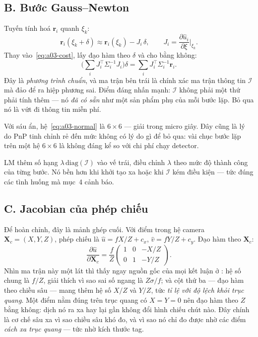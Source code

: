 \documentclass[../../marker.tex]{subfiles}
\begin{document}
\subsection{B. Bước Gauss--Newton}

Tuyến tính hoá \(\mathbf{r}_i\) quanh \(\xi_k\):
\[
\mathbf{r}_i(\xi_k + \delta) \approx \mathbf{r}_i(\xi_k) - J_i\,\delta,
\qquad J_i = \frac{\partial \hat{u}_i}{\partial \xi}\bigg|_{\xi_k}.
\]
Thay vào~\eqref{eq:a03-cost}, lấy đạo hàm theo \(\delta\) và cho bằng không:
\begin{equation}
\Big(\sum_i J_i^\top \Sigma_i^{-1} J_i\Big)\delta = \sum_i J_i^\top \Sigma_i^{-1}\mathbf{r}_i .
\label{eq:a03-normal}
\end{equation}
Đây là \emph{phương trình chuẩn}, và ma trận bên trái là chính xác ma trận thông tin \(\mathcal{I}\) mà  đảo để ra hiệp phương sai. Điểm đáng nhấn mạnh: \(\mathcal{I}\) không phải một thứ phải tính thêm --- nó \emph{đã có sẵn} như một sản phẩm phụ của mỗi bước lặp. Bỏ qua nó là vứt đi thông tin miễn phí.

Với sáu ẩn, hệ~\eqref{eq:a03-normal} là \(6\times6\) --- giải trong micro giây. Đây cũng là lý do PnP tinh chỉnh rẻ đến mức không có lý do gì để bỏ qua: vài chục bước lặp trên một hệ \(6\times6\) là không đáng kể so với chi phí chạy detector.

LM thêm số hạng \(\lambda\,\mathrm{diag}(\mathcal{I})\) vào vế trái, điều chỉnh \(\lambda\) theo mức độ thành công của từng bước. Nó bền hơn khi khởi tạo xa hoặc khi \(\mathcal{I}\) kém điều kiện --- tức đúng các tình huống mà  mục~4 cảnh báo.

\subsection{C. Jacobian của phép chiếu}

Để hoàn chỉnh, đây là mảnh ghép cuối. Với điểm trong hệ camera \(\mathbf{X}_c = (X, Y, Z)\), phép chiếu là \(\hat{u} = f X/Z + c_x\), \(\hat{v} = f Y/Z + c_y\). Đạo hàm theo \(\mathbf{X}_c\):
\[
\frac{\partial \hat{u}}{\partial \mathbf{X}_c}
= \frac{f}{Z}\begin{pmatrix} 1 & 0 & -X/Z \\ 0 & 1 & -Y/Z \end{pmatrix}.
\]
Nhìn ma trận này một lát thì thấy ngay nguồn gốc của mọi kết luận ở : hệ số chung là \(f/Z\), giải thích vì sao sai số ngang là \(Z\sigma/f\); và cột thứ ba --- đạo hàm theo chiều sâu --- mang thêm hệ số \(X/Z\) và \(Y/Z\), tức \emph{tỉ lệ với độ lệch khỏi trục quang}. Một điểm nằm đúng trên trục quang có \(X = Y = 0\) nên đạo hàm theo \(Z\) bằng không: dịch nó ra xa hay lại gần không đổi hình chiếu chút nào. Đây chính là cơ chế sâu xa vì sao chiều sâu khó đo, và vì sao nó chỉ đo được nhờ các điểm \emph{cách xa trục quang} --- tức nhờ kích thước tag.
\end{document}
